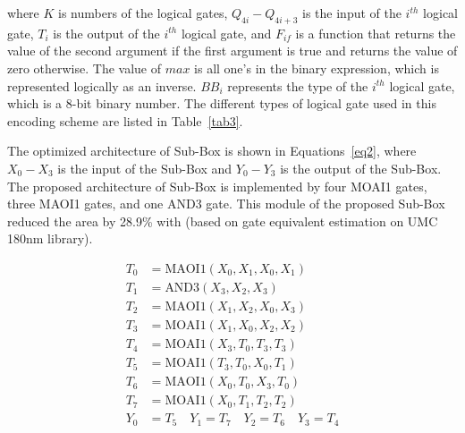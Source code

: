 \documentclass[sn-basic]{sn-jnl}%
\begin{document}
where $K$ is numbers of the logical gates, $Q_{4i}-Q_{4i+3}$ is the input of the $i^{th}$ logical gate, $T_i$ is the output of the $i^{th}$ logical gate, and $F_{if}$ is a function that returns the value of the second argument if the first argument is true and returns the value of zero otherwise.
The value of $max$ is all one's in the binary expression, which is represented logically as an inverse.
$BB_i$ represents the type of the $i^{th}$ logical gate, which is a 8-bit binary number. The different types of logical gate used in this encoding scheme are listed in Table~\ref{tab3}.




The optimized architecture of Sub-Box is shown in Equations~\ref{eq2}, where $X_0-X_3$ is the input of the Sub-Box and $Y_0-Y_3$ is the output of the Sub-Box.
The proposed architecture of Sub-Box is implemented by four MOAI1 gates, three MAOI1 gates, and one AND3 gate.
This module of the proposed Sub-Box reduced the area by 28.9\% with \cite{bao2019peigen} (based on gate equivalent estimation on UMC 180nm library).

\begin{align}
    T_0 & = \text{MAOI1}(X_0, X_1, X_0, X_1) \nonumber          \\
    T_1 & = \text{AND3}(X_3, X_2, X_3) \nonumber                \\
    T_2 & = \text{MAOI1}(X_1, X_2, X_0, X_3) \nonumber          \\
    T_3 & = \text{MOAI1}(X_1, X_0, X_2, X_2) \nonumber          \\
    T_4 & = \text{MOAI1}(X_3, T_0, T_3, T_3) \nonumber          \\
    T_5 & = \text{MOAI1}(T_3, T_0, X_0, T_1) \nonumber          \\
    T_6 & = \text{MAOI1}(X_0, T_0, X_3, T_0) \nonumber          \\
    T_7 & = \text{MOAI1}(X_0, T_1, T_2, T_2) \nonumber          \\
    Y_0 & = T_5 \quad Y_1 = T_7 \quad Y_2 = T_6 \quad Y_3 = T_4
    \label{eq2}
\end{align}
\end{document}
